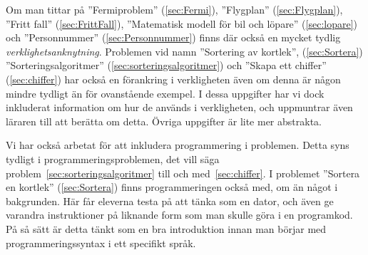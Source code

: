 \textcolor{lila}{Om man tittar på ''Fermiproblem'' (\ref{sec:Fermi}), ''Flygplan'' (\ref{sec:Flygplan}), ''Fritt fall'' (\ref{sec:FrittFall}), ''Matematisk modell för bil och löpare'' (\ref{sec:lopare}) och ''Personnummer'' (\ref{sec:Personnummer}) finns där också en mycket tydlig \textsl{verklighetsanknytning}. Problemen vid namn ''Sortering av kortlek'', (\ref{sec:Sortera}) ''Sorteringsalgoritmer'' (\ref{sec:sorteringsalgoritmer}) och ''Skapa ett chiffer'' (\ref{sec:chiffer}) har också en förankring i verkligheten även om denna är någon mindre tydligt än för ovanstående exempel. I dessa uppgifter har vi dock inkluderat information om hur de används i verkligheten, och uppmuntrar även läraren till att berätta om detta. Övriga uppgifter är lite mer abstrakta. }

\textcolor{lila}{Vi har också arbetat för att inkludera programmering i problemen. Detta syns tydligt i programmeringsproblemen, det vill säga problem~\ref{sec:sorteringsalgoritmer} till och med~\ref{sec:chiffer}. I problemet ''Sortera en kortlek'' (\ref{sec:Sortera}) finns programmeringen också med, om än något i bakgrunden. Här får eleverna testa på att tänka som en dator, och även ge varandra instruktioner på liknande form som man skulle göra i en programkod. På så sätt är detta tänkt som en bra introduktion innan man börjar med programmeringssyntax i ett specifikt språk.}
